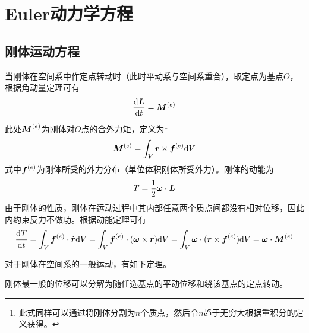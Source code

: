 \section{Euler动力学方程}

\subsection{刚体运动方程}

当刚体在空间系中作定点转动时（此时平动系与空间系重合），取定点为基点$O$，根据角动量定理可有
\begin{equation*}
	\frac{\mathrm{d} \boldsymbol{L}}{\mathrm{d} t} = \boldsymbol{M}^{(e)}
\end{equation*}
此处$\boldsymbol{M}^{(e)}$为刚体对$O$点的合外力矩，定义为\footnote{此式同样可以通过将刚体分割为$n$个质点，然后令$n$趋于无穷大根据重积分的定义获得。}
\begin{equation*}
	\boldsymbol{M}^{(e)} = \int_V \boldsymbol{r} \times \boldsymbol{f}^{(e)} \mathrm{d} V
\end{equation*}
式中$\boldsymbol{f}^{(e)}$为刚体所受的外力分布（单位体积刚体所受外力）。刚体的动能为
\begin{equation*}
	T = \frac12 \boldsymbol{\omega} \cdot \boldsymbol{L}
\end{equation*}
由于刚体的性质，刚体在运动过程中其内部任意两个质点间都没有相对位移，因此内约束反力不做功。根据动能定理可有
\begin{equation*}
	\frac{\mathrm{d} T}{\mathrm{d} t} = \int_V \boldsymbol{f}^{(e)} \cdot \dot{\boldsymbol{r}} \mathrm{d} V = \int_V \boldsymbol{f}^{(e)} \cdot (\boldsymbol{\omega} \times \boldsymbol{r}) \mathrm{d} V = \int_V \boldsymbol{\omega} \cdot (\boldsymbol{r} \times \boldsymbol{f}^{(e)}) \mathrm{d} V = \boldsymbol{\omega} \cdot \boldsymbol{M}^{(e)}
\end{equation*}

对于刚体在空间系的一般运动，有如下定理。

\begin{theorem}
\label{Chasles定理}
刚体最一般的位移可以分解为随任选基点的平动位移和绕该基点的定点转动。
\end{theorem}

